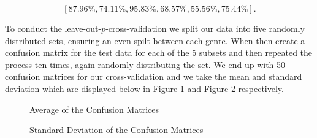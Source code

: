 \documentclass[12pt]{article}
\begin{document}
\[  [87.96\%, 74.11\%, 95.83\%, 68.57\%, 55.56\%, 75.44\% ]. \]


To conduct the leave-out-$p$-cross-validation we split our data into five randomly distributed sets, ensuring an even spilt between each genre. When then create a confusion matrix for the test data for each of the 5 subsets and then repeated the process ten times, again randomly distributing the set. We end up with 50 confusion matrices for our cross-validation and we take the mean and standard deviation which are displayed below in Figure {\ref{fig:avgconfMat}}  and Figure {\ref{fig:stdconfMat}} respectively.
\begin{figure}[h!]
\centering

\caption{Average of the Confusion Matrices} 
\label{fig:avgconfMat}
\end{figure}


\begin{figure}[h!]
\centering

\caption{Standard Deviation of the Confusion Matrices} 
\label{fig:stdconfMat}
\end{figure}
\end{document}
